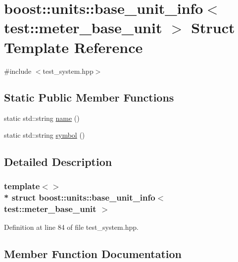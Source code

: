 \hypertarget{structboost_1_1units_1_1base__unit__info_3_01test_1_1meter__base__unit_01_4}{}\section{boost\+:\+:units\+:\+:base\+\_\+unit\+\_\+info$<$ test\+:\+:meter\+\_\+base\+\_\+unit $>$ Struct Template Reference}
\label{structboost_1_1units_1_1base__unit__info_3_01test_1_1meter__base__unit_01_4}


{\ttfamily \#include $<$test\+\_\+system.\+hpp$>$}

\subsection*{Static Public Member Functions}
\begin{DoxyCompactItemize}
\item 
static std\+::string \hyperlink{structboost_1_1units_1_1base__unit__info_3_01test_1_1meter__base__unit_01_4_a5b4ca20bc43b49ee37d355dbeecd5ee1}{name} ()
\item 
static std\+::string \hyperlink{structboost_1_1units_1_1base__unit__info_3_01test_1_1meter__base__unit_01_4_a6fccd8ff2bcb3594170ebc00b6eb1c2d}{symbol} ()
\end{DoxyCompactItemize}


\subsection{Detailed Description}
\subsubsection*{template$<$$>$\\*
struct boost\+::units\+::base\+\_\+unit\+\_\+info$<$ test\+::meter\+\_\+base\+\_\+unit $>$}



Definition at line 84 of file test\+\_\+system.\+hpp.



\subsection{Member Function Documentation}
